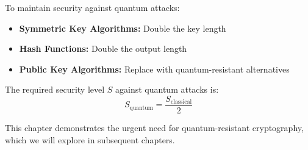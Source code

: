 To maintain security against quantum attacks:

\begin{itemize}
    \item \textbf{Symmetric Key Algorithms:} Double the key length
    \item \textbf{Hash Functions:} Double the output length
    \item \textbf{Public Key Algorithms:} Replace with quantum-resistant alternatives
\end{itemize}

The required security level $S$ against quantum attacks is:
\begin{equation}\label{eq:quantum_security}
    S_{\text{quantum}} = \frac{S_{\text{classical}}}{2}
\end{equation}

This chapter demonstrates the urgent need for quantum-resistant cryptography, which we will explore in subsequent chapters.